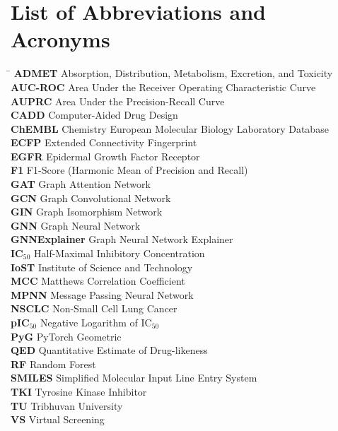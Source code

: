 \documentclass[12pt, a4paper]{article}
\numberwithin{equation}{section}
\begin{document}
\section*{List of Abbreviations and Acronyms}
{\singlespacing
\begin{tabbing}
\hspace{4.5cm} \= \kill
\textbf{ADMET}        \> Absorption, Distribution, Metabolism, Excretion, and Toxicity \\
\textbf{AUC-ROC}      \> Area Under the Receiver Operating Characteristic Curve \\
\textbf{AUPRC}        \> Area Under the Precision-Recall Curve \\
\textbf{CADD}         \> Computer-Aided Drug Design \\
\textbf{ChEMBL}       \> Chemistry European Molecular Biology Laboratory Database \\
\textbf{ECFP}         \> Extended Connectivity Fingerprint \\
\textbf{EGFR}         \> Epidermal Growth Factor Receptor \\
\textbf{F1}           \> F1-Score (Harmonic Mean of Precision and Recall) \\
\textbf{GAT}          \> Graph Attention Network \\
\textbf{GCN}          \> Graph Convolutional Network \\
\textbf{GIN}          \> Graph Isomorphism Network \\
\textbf{GNN}          \> Graph Neural Network \\
\textbf{GNNExplainer} \> Graph Neural Network Explainer \\
\textbf{IC$_{50}$}    \> Half-Maximal Inhibitory Concentration \\
\textbf{IoST}         \> Institute of Science and Technology \\
\textbf{MCC}          \> Matthews Correlation Coefficient \\
\textbf{MPNN}         \> Message Passing Neural Network \\
\textbf{NSCLC}        \> Non-Small Cell Lung Cancer \\
\textbf{pIC$_{50}$}   \> Negative Logarithm of IC$_{50}$ \\
\textbf{PyG}          \> PyTorch Geometric \\
\textbf{QED}          \> Quantitative Estimate of Drug-likeness \\
\textbf{RF}           \> Random Forest \\
\textbf{SMILES}       \> Simplified Molecular Input Line Entry System \\
\textbf{TKI}          \> Tyrosine Kinase Inhibitor \\
\textbf{TU}           \> Tribhuvan University \\
\textbf{VS}           \> Virtual Screening \\
\end{tabbing}
}
\newpage
\end{document}
